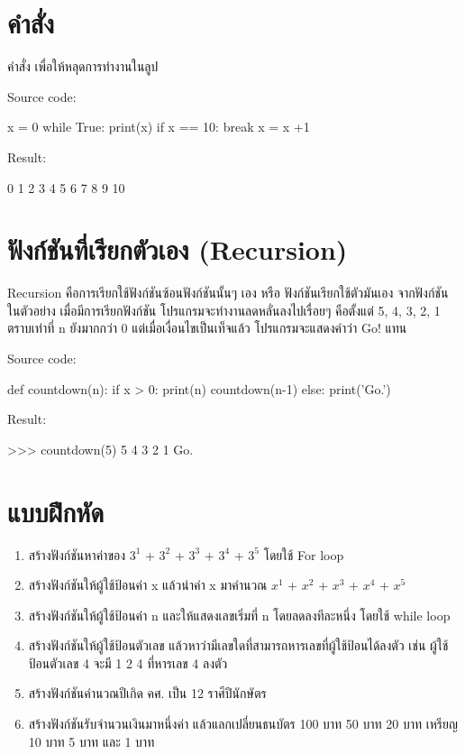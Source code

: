 \section{คำสั่ง  }

คำสั่ง   เพื่อให้หลุดการทำงานในลูป

Source code:
\begin{pycode}
x = 0
while True:
    print(x)
    if x == 10: break
    x = x +1
\end{pycode}

Result:
\begin{pycode}
0
1
2
3
4
5
6
7
8
9
10
\end{pycode}


\section{ฟังก์ชันที่เรียกตัวเอง (Recursion)}

Recursion คือการเรียกใช้ฟังก์ชันซ้อนฟังก์ชันนั้นๆ เอง หรือ ฟังก์ชันเรียกใช้ตัวมันเอง จากฟังก์ชัน   ในตัวอย่าง เมื่อมีการเรียกฟังก์ชัน   โปรแกรมจะทำงานลดหลั่นลงไปเรื่อยๆ คือตั้งแต่ 5, 4, 3, 2, 1 ตราบเท่าที่ n ยังมากกว่า 0 แต่เมื่อเงื่อนไขเป็นเท็จแล้ว โปรแกรมจะแสดงคำว่า Go! แทน

Source code:
\begin{pycode}
def countdown(n):
    if x > 0:
        print(n)
        countdown(n-1)
    else:
        print('Go.')
\end{pycode}
Result:
\begin{pycode}
>>> countdown(5)
5
4
3
2
1
Go.
\end{pycode}


\section{แบบฝึกหัด}
\begin{enumerate} 

\item 	สร้างฟังก์ชันหาค่าของ  $3^1$ + $3^2$ + $3^3$ + $3^4$ + $3^5$  โดยใช้ For loop
\item 	สร้างฟังก์ชันให้ผู้ใช้ป้อนค่า x แล้วนำค่า x มาคำนวณ $x^1$ + $x^2$ + $x^3$ + $x^4$ + $x^5$
\item 	สร้างฟังก์ชันให้ผู้ใช้ป้อนค่า n และให้แสดงเลขเริ่มที่ n โดยลดลงทีละหนึ่ง โดยใช้ while loop
\item 	สร้างฟังก์ชันให้ผู้ใช้ป้อนตัวเลข แล้วหาว่ามีเลขใดที่สามารถหารเลขที่ผู้ใช้ป้อนได้ลงตัว เช่น ผู้ใช้ป้อนตัวเลข 4 จะมี 1 2 4 ที่หารเลข 4 ลงตัว
\item 	สร้างฟังก์ชันคำนวณปีเกิด คศ. เป็น 12 ราศีปีนักษัตร
\item 	สร้างฟังก์ชันรับจำนวนเงินมาหนึ่งค่า แล้วแลกเปลี่ยนธนบัตร 100 บาท 50 บาท 20 บาท เหรียญ 10 บาท 5 บาท และ 1 บาท
\end{enumerate}